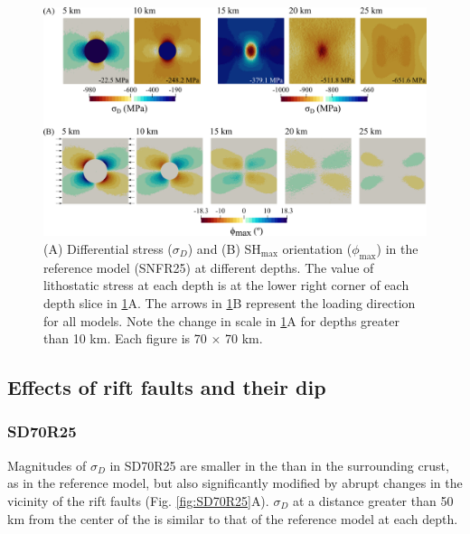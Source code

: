 \documentclass[draft]{agujournal2018}
\begin{document}
\begin{figure}[ht]
\centering
\includegraphics[width=30pc]{Figures/SNFR25.png}
\caption{(A) Differential stress ($\sigma_D$) and (B) SH$_{\max}$ orientation ($\phi_{\max}$) in the reference model (SNFR25) at different depths. The value of lithostatic stress at each depth is at the lower right corner of each depth slice in \ref{fig:SNFR25_ref}A. The arrows in \ref{fig:SNFR25_ref}B represent the loading direction for all models. Note the change in scale in \ref{fig:SNFR25_ref}A for depths greater than 10 km. Each figure is 70 $\times$ 70 km.} 
\label{fig:SNFR25_ref}
\end{figure} 

\subsection{Effects of rift faults and their dip}
\subsubsection{SD70R25}
Magnitudes of $\sigma_{D}$ in SD70R25 are smaller in the  than in the surrounding crust, as in the reference model, but also significantly modified by abrupt changes in the vicinity of the rift faults (Fig. \ref{fig:SD70R25}A). $\sigma_{D}$ at a distance greater than 50 km from the center of the  is similar to that of the reference model at each depth. 
\end{document}
